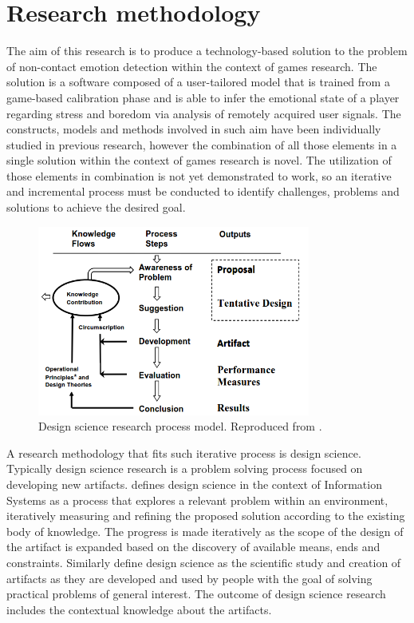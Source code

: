 \chapter{Research methodology}

The aim of this research is to produce a technology-based solution to the problem of non-contact emotion detection within the context of games research. The solution is a software composed of a user-tailored model that is trained from a game-based calibration phase and is able to infer the emotional state of a player regarding stress and boredom via analysis of remotely acquired user signals. The constructs, models and methods involved in such aim have been individually studied in previous research, however the combination of all those elements in a single solution within the context of games research is novel. The utilization of those elements in combination is not yet demonstrated to work, so an iterative and incremental process must be conducted to identify challenges, problems and solutions to achieve the desired goal.

\begin{figure}[h]
    \centering
    \includegraphics[width=0.8\textwidth]{figures/vaishnavi-design-science-process-model.png}
    \caption{Design science research process model. Reproduced from \textcite{vaishnavi2004design}.}
    \label{fig:vaishnavi-design-science-process-model}
\end{figure}

A research methodology that fits such iterative process is design science. Typically design science research is a problem solving process focused on developing new artifacts. \textcite{hevner2004design} defines design science in the context of Information Systems as a process that explores a relevant problem within an environment, iteratively measuring and refining the proposed solution according to the existing body of knowledge. The progress is made iteratively as the scope of the design of the artifact is expanded based on the discovery of available means, ends and constraints. Similarly \textcite{johannesson2014introduction} define design science as the scientific study and creation of artifacts as they are developed and used by people with the goal of solving practical problems of general interest. The outcome of design science research includes the contextual knowledge about the artifacts.


